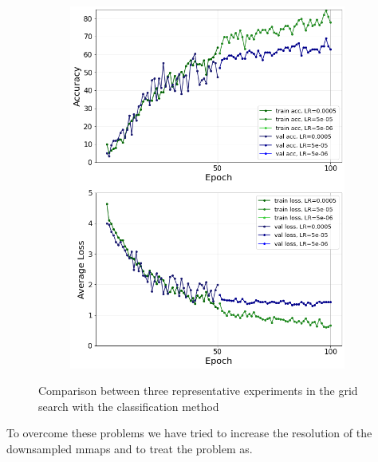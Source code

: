 \documentclass[10pt,twocolumn,hidelinks,letterpaper]{article}
\begin{document}
\begin{figure}
\begin{subfigure}{.325\linewidth}
  	\includegraphics[width=\linewidth]{images/grid_comparison/acc69lr5e-4step50100gamma01_no_reg.png}
  \end{subfigure}
  \caption{Comparison between three representative experiments in the grid search with the classification method}
  \label{grid_comparison}
\end{figure}




To overcome these problems we have tried to increase the resolution of the downsampled mmaps and to treat the problem as.
\end{document}
